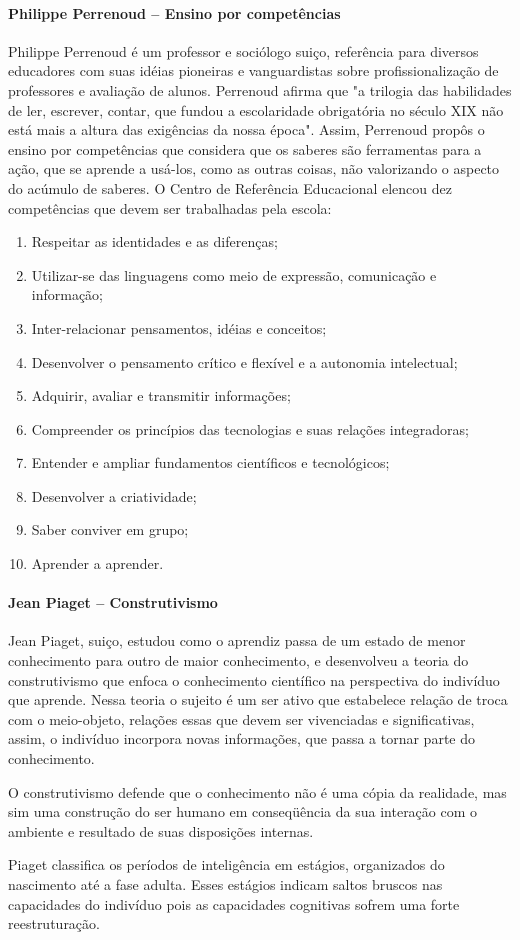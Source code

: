 \paragraph{Philippe Perrenoud – Ensino por competências}
Philippe Perrenoud é um professor e sociólogo suiço, referência para diversos educadores com suas idéias pioneiras e vanguardistas sobre profissionalização de professores e avaliação de alunos. Perrenoud afirma que "a trilogia das habilidades de ler, escrever, contar, que fundou a escolaridade obrigatória no século XIX não está mais a altura das exigências da nossa época". Assim, Perrenoud propôs o ensino por competências que considera que os saberes são ferramentas para a ação, que se aprende a usá-los, como as outras coisas, não valorizando o aspecto do acúmulo de saberes.
O Centro de Referência Educacional elencou dez competências que devem ser trabalhadas pela escola: 
\begin{enumerate}
\item Respeitar as identidades e as diferenças;
\item Utilizar-se das linguagens como meio de expressão, comunicação e informação;
\item Inter-relacionar pensamentos, idéias e conceitos;
\item Desenvolver o pensamento crítico e flexível e a autonomia intelectual;
\item Adquirir, avaliar e transmitir informações;
\item Compreender os princípios das tecnologias e suas relações integradoras;
\item Entender e ampliar fundamentos científicos e tecnológicos;
\item Desenvolver a criatividade; 
\item Saber conviver em grupo; 
\item Aprender a aprender.
\end{enumerate} 

\paragraph{Jean Piaget – Construtivismo}
Jean Piaget, suiço, estudou como o aprendiz passa de um estado de menor conhecimento para outro de maior conhecimento, e desenvolveu a teoria do construtivismo que enfoca o conhecimento científico na perspectiva do indivíduo que aprende. Nessa teoria o sujeito é um ser ativo que estabelece relação de troca com o meio-objeto, relações essas que devem ser vivenciadas e significativas, assim, o indivíduo incorpora novas informações, que passa a tornar parte do conhecimento.
\begin{citacao}
O construtivismo defende que o conhecimento não é uma cópia da realidade, mas sim
uma construção do ser humano em conseqüência da sua interação com o ambiente e resultado de suas disposições internas.
\end{citacao} 
Piaget classifica os períodos de inteligência em estágios, organizados do nascimento até a fase adulta. Esses estágios indicam saltos bruscos nas capacidades do indivíduo pois as capacidades cognitivas sofrem uma forte reestruturação.

